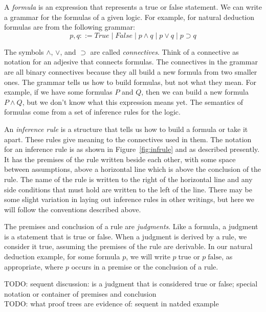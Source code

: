 \documentclass[conference]{IEEEtran}
\begin{document}
A \textit{formula} is an expression that represents a true or false statement. We can write a grammar for the formulas of a given logic. For example, for natural deduction formulas are from the following grammar:
$$
p, q ::= \mathit{True} \; | \; \mathit{False} \; | \; p \wedge q \; | \; p \vee q \; | \; p \supset q
$$

The symbols $\wedge$, $\vee$, and $\supset$ are called \textit{connectives}. Think of a connective as notation for an adjesive that connects formulas. The connectives in the grammar are all binary connectives because they all build a new formula from two smaller ones. The grammar tells us how to build formulas, but not what they mean. For example, if we have some formulas $P$ and $Q$, then we can build a new formula $P \wedge Q$, but we don't know what this expression means yet. The semantics of formulas come from a set of inference rules for the logic.

An \textit{inference rule} is a structure that tells us how to build a formula or take it apart. These rules give meaning to the connectives used in them. The notation for an inference rule is as shown in Figure~\ref{fig:infrule} and as described presently. It has the premises of the rule written beside each other, with some space between assumptions, above a horizontal line which is above the conclusion of the rule. The name of the rule is written to the right of the horizontal line and any side conditions that must hold are written to the left of the line. There may be some slight variation in laying out inference rules in other writings, but here we will follow the conventions described above.

The premises and conclusion of a rule are \textit{judgments}. Like a formula, a judgment is a statement that is true or false. When a judgment is derived by a rule, we consider it true, assuming the premises of the rule are derivable. In our natural deduction example, for some formula $p$, we will write $p \; \mathrm{true}$ or $p \; \mathrm{false}$, as appropriate, where $p$ occurs in a premise or the conclusion of a rule. %

TODO: sequent discussion: is a judgment that is considered true or false; special notation or container of premises and conclusion \\

TODO: what proof trees are evidence of: sequent in natded example \\
\end{document}
